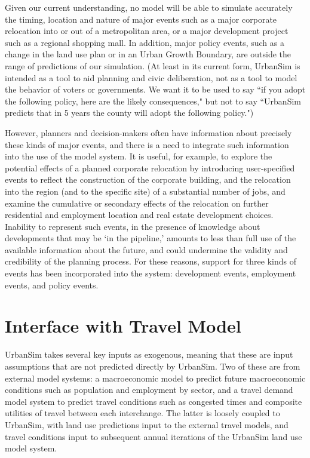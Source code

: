 Given our current understanding, no model will be able to simulate
accurately the timing, location and nature of major events such as
a major corporate relocation into or out of a metropolitan area,
or a major development project such as a regional shopping mall.
In addition, major policy events, such as a change in the land use
plan or in an Urban Growth Boundary, are outside the range of
predictions of our simulation.  (At least in its current form,
UrbanSim is intended as a tool to aid planning and civic
deliberation, not as a tool to model the behavior of voters or
governments.  We want it to be used to say ``if you adopt the
following policy, here are the likely consequences," but not to
say ``UrbanSim predicts that in 5 years the county will adopt the
following policy.")

However, planners and decision-makers often have information about
precisely these kinds of major events, and there is a need to
integrate such information into the use of the model system.  It
is useful, for example, to explore the potential effects of a
planned corporate relocation by introducing user-specified events
to reflect the construction of the corporate building, and the
relocation into the region (and to the specific site) of a
substantial number of jobs, and examine the cumulative or
secondary effects of the relocation on further residential and
employment location and real estate development choices. Inability
to represent such events, in the presence of knowledge about
developments that may be `in the pipeline,' amounts to less than
full use of the available information about the future, and could
undermine the validity and credibility of the planning process.
For these reasons, support for three kinds of events has been
incorporated into the system: development events, employment
events, and policy events.


\section{Interface with Travel Model}

UrbanSim takes several key inputs as exogenous, meaning that these
are input assumptions that are not predicted directly by UrbanSim.  Two of these are
from external model systems: a macroeconomic model to predict
future macroeconomic conditions such as population and employment
by sector, and a travel demand model system to predict travel
conditions such as congested times and composite utilities of
travel between each interchange.  The latter is loosely coupled to
UrbanSim, with land use predictions input to the external travel
models, and travel conditions input to subsequent annual
iterations of the UrbanSim land use model system.

